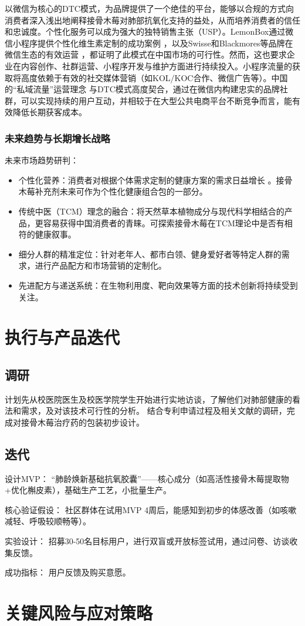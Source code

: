 \documentclass[12pt]{ctexart}
\begin{document}
以微信为核心的DTC模式，为品牌提供了一个绝佳的平台，能够以合规的方式向消费者深入浅出地阐释接骨木莓对肺部抗氧化支持的益处，从而培养消费者的信任和忠诚度。个性化服务可以成为强大的独特销售主张（USP）。LemonBox通过微信小程序提供个性化维生素定制的成功案例 ，以及Swisse和Blackmores等品牌在微信生态的有效运营 ，都证明了此模式在中国市场的可行性。然而，这也要求企业在内容创作、社群运营、小程序开发与维护方面进行持续投入。小程序流量的获取将高度依赖于有效的社交媒体营销（如KOL/KOC合作、微信广告等）。中国的“私域流量”运营理念 与DTC模式高度契合，通过在微信内构建忠实的品牌社群，可以实现持续的用户互动，并相较于在大型公共电商平台不断竞争而言，能有效降低长期获客成本。

\subsubsection{未来趋势与长期增长战略}

未来市场趋势研判：
\begin{itemize}
    \item 个性化营养：消费者对根据个体需求定制的健康方案的需求日益增长 。接骨木莓补充剂未来可作为个性化健康组合包的一部分。
    \item 传统中医（TCM）理念的融合：将天然草本植物成分与现代科学相结合的产品，更容易获得中国消费者的青睐。可探索接骨木莓在TCM理论中是否有相符的健康叙事。
    \item 细分人群的精准定位：针对老年人、都市白领、健身爱好者等特定人群的需求，进行产品配方和市场营销的定制化。
    \item 先进配方与递送系统：在生物利用度、靶向效果等方面的技术创新将持续受到关注。
\end{itemize}
\section{执行与产品迭代}
\subsection{调研}
计划先从校医院医生及校医学院学生开始进行实地访谈，了解他们对肺部健康的看法和需求，及对该技术可行性的分析。
结合专利申请过程及相关文献的调研，完成对接骨木莓治疗药的包装初步设计。
\subsection{迭代}
设计MVP：
“肺龄焕新基础抗氧胶囊”——核心成分（如高活性接骨木莓提取物+优化槲皮素），基础生产工艺，小批量生产。

核心验证假设： 社区群体在试用MVP 4周后，能感知到初步的体感改善（如咳嗽减轻、呼吸较顺畅等）。

实验设计： 招募30-50名目标用户，进行双盲或开放标签试用，通过问卷、访谈收集反馈。

成功指标： 用户反馈及购买意愿。
\section{关键风险与应对策略}
\end{document}
